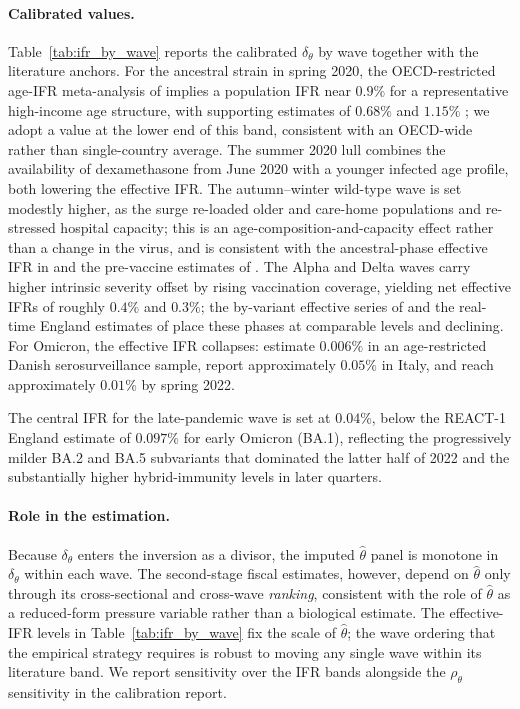 \documentclass[12pt, a4paper]{article}
\begin{document}
\paragraph{Calibrated values.}
Table~\ref{tab:ifr_by_wave} reports the calibrated $\delta_\theta$ by wave
together with the literature anchors. For the ancestral strain in spring 2020,
the OECD-restricted age-IFR meta-analysis of \citet{levin2020} implies a
population IFR near $0.9\%$ for a representative high-income age structure,
with supporting estimates of $0.68\%$ \citep{meyerowitzkatz2020} and $1.15\%$
\citep{brazeau2020}; we adopt a value at the lower end of this band,
consistent with an OECD-wide rather than single-country average. The summer
2020 lull combines the availability of dexamethasone from June 2020
\citep{recovery2021} with a younger infected age profile, both lowering the
effective IFR. The autumn--winter wild-type wave is set modestly higher, as
the surge re-loaded older and care-home populations and re-stressed hospital
capacity; this is an age-composition-and-capacity effect rather than a change
in the virus, and is consistent with the ancestral-phase effective IFR in
\citet{marziano2023} and the pre-vaccine estimates of
\citet{covidforecast2022}. The Alpha and Delta waves carry higher intrinsic
severity \citep{davies2021nature,challen2021,nyberg2022} offset by rising
vaccination coverage, yielding net effective IFRs of roughly $0.4\%$ and
$0.3\%$; the by-variant effective series of \citet{marziano2023} and the
real-time England estimates of \citet{ward2024} place these phases at
comparable levels and declining. For Omicron, the effective IFR collapses:
\citet{erikstrup2022} estimate $0.006\%$ in an age-restricted Danish
serosurveillance sample, \citet{marziano2023} report approximately $0.05\%$
in Italy, and \citet{ward2024} reach approximately $0.01\%$ by spring 2022.

The central IFR for the late-pandemic wave is set at $0.04\%$, below the
REACT-1 England estimate of $0.097\%$ for early Omicron (BA.1), reflecting the
progressively milder BA.2 and BA.5 subvariants that dominated the latter half
of 2022 and the substantially higher hybrid-immunity levels in later quarters.

\paragraph{Role in the estimation.}
Because $\delta_\theta$ enters the inversion as a divisor, the imputed
$\hat{\theta}$ panel is monotone in $\delta_\theta$ within each wave. The
second-stage fiscal estimates, however, depend on $\hat{\theta}$ only through
its cross-sectional and cross-wave \emph{ranking}, consistent with the role of
$\hat{\theta}$ as a reduced-form pressure variable rather than a biological
estimate. The effective-IFR levels in Table~\ref{tab:ifr_by_wave} fix the
scale of $\hat{\theta}$; the wave ordering that the empirical strategy
requires is robust to moving any single wave within its literature band. We
report sensitivity over the IFR bands alongside the $\rho_\theta$ sensitivity
in the calibration report.
\end{document}
